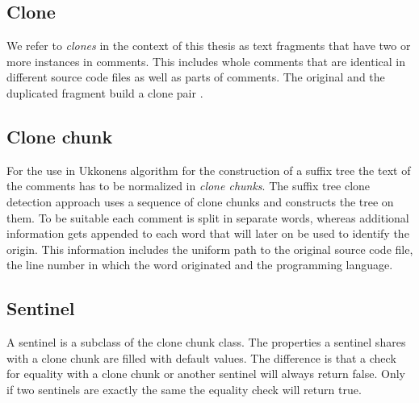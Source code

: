 \subsection{Clone}
We refer to \textit{clones} in the context of this thesis as text fragments that have two or more instances in comments. This includes whole comments that are identical in different source code files as well as parts of comments. The original and the duplicated fragment build a clone pair \cite{Roy2007}. 

\subsection{Clone chunk}
For the use in Ukkonens algorithm for the construction of a suffix tree \cite{Ukkonen1995} the text of the comments has to be normalized in \textit{clone chunks}. The suffix tree clone detection approach uses a sequence of clone chunks and constructs the tree on them. To be suitable each comment is split in separate words, whereas additional information gets appended to each word that will later on be used to identify the origin. This information includes the uniform path to the original source code file, the line number in which the word originated and the programming language.

\subsection{Sentinel}
\label{chapter_sentinel}
A sentinel is a subclass of the clone chunk class. The properties a sentinel shares with a clone chunk are filled with default values. The difference is that a check for equality with a clone chunk or another sentinel will always return false. Only if two sentinels are exactly the same the equality check will return true.

